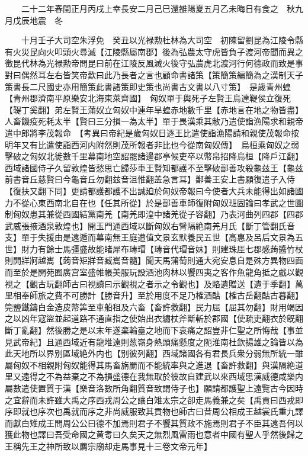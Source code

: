 　　二十二年春閏正月丙戌上幸長安二月己巳還雒陽夏五月乙未晦日有食之　秋九月戊辰地震　冬

　　十月壬子大司空朱浮免　癸丑以光禄勲杜林為大司空　初陳留劉昆為江陵令縣有火災昆向火叩頭火尋滅【江陵縣屬南郡】後為弘農太守虎皆負子渡河帝聞而異之徵昆代林為光禄勲帝問昆曰前在江陵反風滅火後守弘農虎北渡河行何德政而致是事對曰偶然耳左右皆笑帝歎曰此乃長者之言也顧命書諸策【策簡策編簡為之漢制天子策書長二尺國史亦用簡策此書諸策即史策也尚書古文書以八寸策】　是歲青州蝗【青州郡濟南平原樂安北海東萊齊國】　匈奴單于輿死子左賢王烏達鞮侯立復死【鞮丁奚翻】弟左賢王蒲奴立匈奴中連年旱蝗赤地數千里【赤地言在地之物皆盡】人畜饑疫死耗太半【賢曰三分損一為太半】單于畏漢乘其敝乃遣使詣漁陽求和親帝遣中郎將李茂報命　【考異曰帝紀是歲匈奴日逐王比遣使詣漁陽請和親使茂報命按明年又有比遣使詣西河内附然則茂所報者非比也今從南匈奴傳】　烏桓乘匈奴之弱擊破之匈奴北徙數千里幕南地空詔罷諸邊郡亭候吏卒以幣帛招降烏桓【降戶江翻】　西域諸國侍子久留敦煌皆愁思亡歸莎車王賢知都護不至擊破鄯善攻殺龜兹王【龜兹前書音丘慈賢曰今龜音丘勿翻兹音沮惟翻盖急言耳】鄯善王安上書願復遣子入侍【復扶又翻下同】更請都護都護不出誠廹於匈奴帝報曰今使者大兵未能得出如諸國力不從心東西南北自在也【任其所從】於是鄯善車師復附匈奴班固論曰孝武之世圖制匈奴患其兼從西國結黨南羌【南羌即湟中諸羌從子容翻】乃表河曲列四郡【四郡武威張掖酒泉敦煌也】開玉門通西域以斷匈奴右臂隔絶南羌月氏【斷丁管翻氏音支】單于失援由是遠遁而幕南無王庭遭值文景玄默養民五世【高惠及呂后文景為五世】財力有餘士馬彊盛故能睹犀布瑇瑁【瑇音代瑁音妹】則建珠厓七郡感蒟醬竹杖則開牂牁越巂【蒟音矩牂音臧巂音髓】聞天馬蒲萄則通大宛安息自是殊方異物四面而至於是開苑囿廣宫室盛帷帳美服玩設酒池肉林以饗四夷之客作魚龍角抵之戲以觀視之【觀古玩翻師古曰視讀曰示觀視之者示之令觀也】及賂遺贈送【遺于季翻】萬里相奉師旅之費不可勝計【勝音升】至於用度不足乃榷酒酤【榷古岳翻酤古暮翻】筦鹽鐵鑄白金造皮幣筭至車船租及六畜【畜許救翻】民力屈【屈其勿翻】財用竭因之以凶年寇盜並起道路不通直指之使始出衣繡杖斧斷斬於郡國【使疏吏翻衣於旣翻斷丁亂翻】然後勝之是以末年遂棄輪臺之地而下哀痛之詔豈非仁聖之所悔哉【事並見武帝紀】且通西域近有龍堆遠則葱嶺身熱頭痛懸度之阨淮南杜欽揚雄之論皆以為此天地所以界别區域絶外内也【别彼列翻】西域諸國各有君長兵衆分弱無所統一雖屬匈奴不相親附匈奴能得其馬畜旃罽而不能統率與之進退【畜許救翻】與漢隔絶道里又遠得之不為益棄之不為損盛德在我無取於彼故自建武以來西域思漢威德咸樂内屬數遣使置質于漢【樂音洛數所角翻質音致謂侍子也】願請都護聖上遠覽古今因時之宜辭而未許雖大禹之序西戎周公之讓白雉太宗之卻走馬義兼之矣【禹貢曰西戎即序即就也序次也禹就而序之非尚威服致其貢物也師古曰昔周公相成王越裳氏重九譯而獻白雉成王問周公公曰德不加焉則君子不饗其質政不施焉則君子不臣其遠吾何以獲此物也譯曰吾受命國之黄耉曰久矣天之無烈風雷雨也意者中國有聖人乎然後歸之王稱先王之神所致以薦宗廟却走馬事見十三卷文帝元年】

